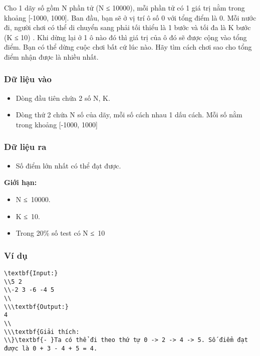 



   Cho 1 dãy số gồm N phần tử (N ≤ 10000), mỗi phần tử có 1 giá trị nằm trong khoảng [-1000, 1000]. Ban đầu, bạn sẽ ở vị trí ô số 0 với tổng điểm là 0. Mỗi nước đi, người chơi có thể di chuyển sang phải tối thiểu là 1 bước và tối đa là K bước (K ≤ 10) . Khi dừng lại ở 1 ô nào đó thì giá trị của ô đó sẽ được cộng vào tổng điểm. Bạn có thể dừng cuộc chơi bất cứ lúc nào. Hãy tìm cách chơi sao cho tổng điểm nhận được là nhiều nhất.  

\subsubsection{   Dữ liệu vào  }
\begin{itemize}
	\item     Dòng đầu tiên chứa 2 số N, K.   
\end{itemize}
\begin{itemize}
	\item     Dòng thứ 2 chứa N số của dãy, mỗi số cách nhau 1 dấu cách. Mỗi số nằm trong khoảng [-1000, 1000]   
\end{itemize}

\subsubsection{   Dữ liệu ra  }
\begin{itemize}
	\item     Số điểm lớn nhất có thể đạt được.   
\end{itemize}

\textbf{    Giới hạn:   }
\begin{itemize}
	\item     N ≤ 10000.   
	\item     K ≤ 10.   
	\item     Trong 20\% số test có N ≤ 10   
\end{itemize}

\subsubsection{   Ví dụ  }
\begin{verbatim}
\textbf{Input:}
\\5 2
\\-2 3 -6 -4 5
\\
\\\textbf{Output:}
4
\\
\\\textbf{Giải thích:
\\}\textbf{- }Ta có thể đi theo thứ tự 0 -> 2 -> 4 -> 5. Số điểm đạt được là 0 + 3 - 4 + 5 = 4.\end{verbatim}
